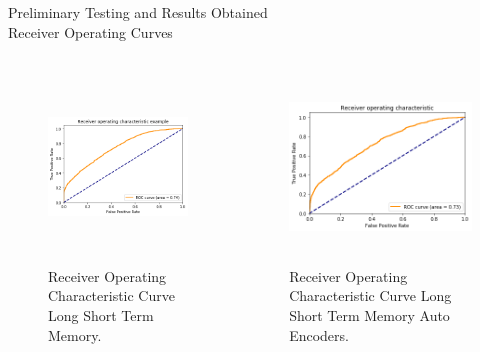 \documentclass{beamer}
\begin{document}
\begin{frame}{Preliminary Testing and Results Obtained\\ \footnotesize{Receiver Operating Curves}}
    \begin{columns}
        \begin{column}{.5\textwidth}
            \begin{figure}[h]
            \centerline{\includegraphics[width=2in,height=2in]{lstm4.png}}
            \caption{Receiver Operating Characteristic Curve Long Short Term Memory.}
            \end{figure}
        \end{column}
        \begin{column}{5cm}
            \begin{figure}[h]
            \centerline{\includegraphics[width=2in,height=2in]{lstm_auto_encoder4.png}}
            \caption{Receiver Operating Characteristic Curve Long Short Term Memory Auto Encoders.}
            \end{figure}
        \end{column}
    \end{columns} 
    
\end{frame}
\end{document}
